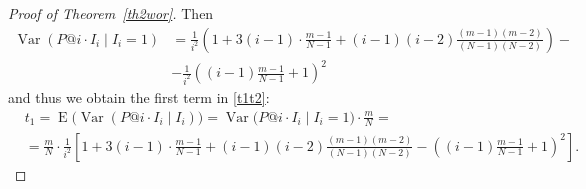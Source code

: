\documentclass[10pt,a4paper]{amsart}
\begin{document}
\begin{proof}[Proof of Theorem~\ref {th2wor}]
Then \begin{equation*}
\begin{split} 
\operatorname{Var}(P@i\cdot I_i \mid I_i=1)&=\frac{1}{i^2}\left(1+3(i-1)\cdot \frac{m-1}{N-1}+
(i-1)(i-2)\frac{(m-1)(m-2)}{(N-1)(N-2)}\right)-\\
&-\frac{1}{i^2}\left((i-1)\frac{m-1}{N-1}+1 \right)^2
\end{split} 
\end{equation*}
and thus we obtain the first term in \eqref{t1t2}: 
\begin{equation*}
\begin{split} &t_1=\operatorname{E}\big(\operatorname{Var}(P@i\cdot I_i \mid I_i)\big)=\operatorname{Var}\big(P@i\cdot I_i \mid I_i=1\big)\cdot \frac{m}{N}=\\
&=\frac{m}{N} \cdot \frac{1}{i^2} \left[1+3(i-1)\cdot \frac{m-1}{N-1}+
(i-1)(i-2)\frac{(m-1)(m-2)}{(N-1)(N-2)}-((i-1)\frac{m-1}{N-1}+1)^2 \right].
\end{split}
\end{equation*}


\end{proof}
\end{document}
